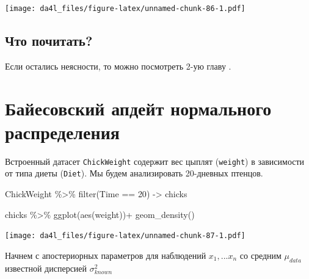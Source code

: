 \documentclass[
]{book}
\newenvironment{Shaded}{\begin{snugshade}}{\end{snugshade}}
\newcommand{\DecValTok}[1]{\textcolor[rgb]{0.00,0.00,0.81}{#1}}
\newcommand{\FunctionTok}[1]{\textcolor[rgb]{0.00,0.00,0.00}{#1}}
\newcommand{\NormalTok}[1]{#1}
\newcommand{\OtherTok}[1]{\textcolor[rgb]{0.56,0.35,0.01}{#1}}
\newcommand{\SpecialCharTok}[1]{\textcolor[rgb]{0.00,0.00,0.00}{#1}}
\begin{document}
\texttt{[image: da4l\_files/figure-latex/unnamed-chunk-86-1.pdf]}

\hypertarget{ux447ux442ux43e-ux43fux43eux447ux438ux442ux430ux442ux44c}{%
\subsection{Что почитать?}\label{ux447ux442ux43e-ux43fux43eux447ux438ux442ux430ux442ux44c}}

Если остались неясности, то можно посмотреть 2-ую главу \citep{robinson17}.

\hypertarget{ux431ux430ux439ux435ux441ux43eux432ux441ux43aux438ux439-ux430ux43fux434ux435ux439ux442-ux43dux43eux440ux43cux430ux43bux44cux43dux43eux433ux43e-ux440ux430ux441ux43fux440ux435ux434ux435ux43bux435ux43dux438ux44f}{%
\section{Байесовский апдейт нормального распределения}\label{ux431ux430ux439ux435ux441ux43eux432ux441ux43aux438ux439-ux430ux43fux434ux435ux439ux442-ux43dux43eux440ux43cux430ux43bux44cux43dux43eux433ux43e-ux440ux430ux441ux43fux440ux435ux434ux435ux43bux435ux43dux438ux44f}}

Встроенный датасет \texttt{ChickWeight} содержит вес цыплят (\texttt{weight}) в зависимости от типа диеты (\texttt{Diet}). Мы будем анализировать 20-дневных птенцов.

\begin{Shaded}
\begin{Highlighting}[]
\NormalTok{ChickWeight }\SpecialCharTok{\%\textgreater{}\%} 
  \FunctionTok{filter}\NormalTok{(Time }\SpecialCharTok{==} \DecValTok{20}\NormalTok{) }\OtherTok{{-}\textgreater{}}
\NormalTok{  chicks}

\NormalTok{chicks }\SpecialCharTok{\%\textgreater{}\%} 
  \FunctionTok{ggplot}\NormalTok{(}\FunctionTok{aes}\NormalTok{(weight))}\SpecialCharTok{+}
  \FunctionTok{geom\_density}\NormalTok{()}
\end{Highlighting}
\end{Shaded}

\texttt{[image: da4l\_files/figure-latex/unnamed-chunk-87-1.pdf]}

Начнем с апостериорных параметров для наблюдений \(x_1, ... x_n\) со средним \(\mu_{data}\) известной дисперсией \(\sigma_{known}^2\)
\end{document}
